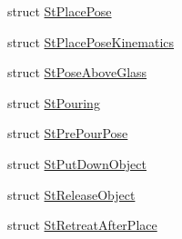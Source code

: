 \begin{DoxyCompactItemize}
\item 
struct \hyperlink{structsm__mtc__pour_1_1StPlacePose}{St\+Place\+Pose}
\item 
struct \hyperlink{structsm__mtc__pour_1_1StPlacePoseKinematics}{St\+Place\+Pose\+Kinematics}
\item 
struct \hyperlink{structsm__mtc__pour_1_1StPoseAboveGlass}{St\+Pose\+Above\+Glass}
\item 
struct \hyperlink{structsm__mtc__pour_1_1StPouring}{St\+Pouring}
\item 
struct \hyperlink{structsm__mtc__pour_1_1StPrePourPose}{St\+Pre\+Pour\+Pose}
\item 
struct \hyperlink{structsm__mtc__pour_1_1StPutDownObject}{St\+Put\+Down\+Object}
\item 
struct \hyperlink{structsm__mtc__pour_1_1StReleaseObject}{St\+Release\+Object}
\item 
struct \hyperlink{structsm__mtc__pour_1_1StRetreatAfterPlace}{St\+Retreat\+After\+Place}
\end{DoxyCompactItemize}
